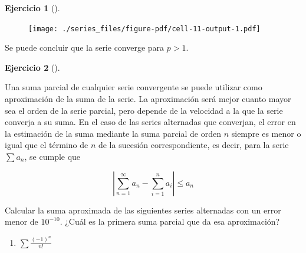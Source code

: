 \documentclass[
  a4paper,
]{scrreport}
\providecommand{\tightlist}{%
  \setlength{\itemsep}{0pt}\setlength{\parskip}{0pt}}\usepackage{longtable,booktabs,array}
\theoremstyle{definition}
\newtheorem{exercise}{Ejercicio}[chapter]
\theoremstyle{remark}
\begin{document}
\begin{exercise}[]
\begin{tcolorbox}
\begin{figure}[H]

{\centering \texttt{[image: ./series\_files/figure-pdf/cell-11-output-1.pdf]}

}

\end{figure}

Se puede concluir que la serie converge para \(p>1\).

\end{tcolorbox}

\end{exercise}

\leavevmode{}%
\begin{exercise}[]\label{exr-serie-alternada}

Una suma parcial de cualquier serie convergente se puede utilizar como
aproximación de la suma de la serie. La aproximación será mejor cuanto
mayor sea el orden de la serie parcial, pero depende de la velocidad a
la que la serie converja a su suma. En el caso de las series alternadas
que converjan, el error en la estimación de la suma mediante la suma
parcial de orden \(n\) siempre es menor o igual que el término de \(n\)
de la sucesión correspondiente, es decir, para la serie \(\sum a_n\), se
cumple que

\[
|\sum_{n=1}^\infty a_n - \sum_{i=1}^n a_i|\leq a_n
\]

Calcular la suma aproximada de las siguientes series alternadas con un
error menor de \(10^{-10}\). ¿Cuál es la primera suma parcial que da esa
aproximación?

\begin{enumerate}
\def\labelenumi{\alph{enumi}.}
\tightlist
\item
  \(\sum \frac{(-1)^n}{n!}\)
\end{enumerate}

\begin{tcolorbox}[enhanced jigsaw, toptitle=1mm, colframe=quarto-callout-tip-color-frame, opacitybacktitle=0.6, colback=white, titlerule=0mm, toprule=.15mm, arc=.35mm, coltitle=black, colbacktitle=quarto-callout-tip-color!10!white, bottomtitle=1mm, bottomrule=.15mm, title=\textcolor{quarto-callout-tip-color}{\faLightbulb}\hspace{0.5em}{Solución}, rightrule=.15mm, opacityback=0, leftrule=.75mm, left=2mm, breakable]


\end{tcolorbox}
\end{exercise}
\end{document}
